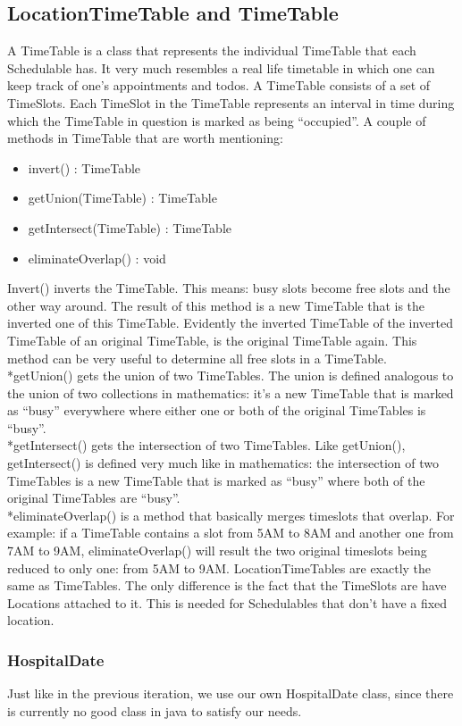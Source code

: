 \documentclass[12pt]{article}
\begin{document}
\subsection{LocationTimeTable and TimeTable}
A TimeTable is a class that represents the individual TimeTable that each Schedulable has. It very much resembles a real life timetable in which one can keep track of one’s appointments and todos. A TimeTable consists of a set of TimeSlots. Each TimeSlot in the TimeTable represents an interval in time during which the TimeTable in question is marked as being “occupied”. A couple of methods in TimeTable that are worth mentioning:
\begin{itemize}
\item{invert() : TimeTable}
\item{getUnion(TimeTable) : TimeTable}
\item{getIntersect(TimeTable) : TimeTable}
\item{eliminateOverlap() : void}
\end{itemize}
Invert() inverts the TimeTable. This means: busy slots become free slots and the other way around. The result of this method is a new TimeTable that is the inverted one of this TimeTable. Evidently the inverted TimeTable of the inverted TimeTable of an original TimeTable, is the original TimeTable again. This method can be very useful to determine all free slots in a  TimeTable. 
\\*getUnion() gets the union of two TimeTables. The union is defined analogous to the union of two collections in mathematics: it’s a new TimeTable that is marked as “busy” everywhere where either one or both of the original TimeTables is “busy”.
\\*getIntersect() gets the intersection of two TimeTables. Like getUnion(), getIntersect() is defined very much like in mathematics: the intersection of two TimeTables is a new TimeTable that is marked as “busy” where both of the original TimeTables are “busy”.
\\*eliminateOverlap() is a method that basically merges timeslots that overlap. For example: if a TimeTable contains a slot from 5AM to 8AM and another one from 7AM to 9AM, eliminateOverlap() will result the two original timeslots being reduced to only one: from 5AM to 9AM.
LocationTimeTables are exactly the same as TimeTables. The only difference is the fact that the TimeSlots are have Locations attached to it. This is needed for Schedulables that don't have a fixed location.
\subsubsection{HospitalDate}
Just like in the previous iteration, we use our own HospitalDate class, since there is currently no good class in java to satisfy our needs.
\end{document}
